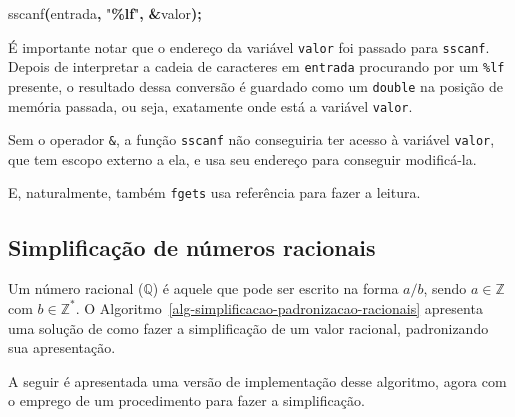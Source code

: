 \documentclass[
  11pt,
  a4paper,
]{scrbook}
\newenvironment{Shaded}{\begin{snugshade}}{\end{snugshade}}
\newcommand{\NormalTok}[1]{#1}
\newcommand{\OperatorTok}[1]{\textcolor[rgb]{0.81,0.36,0.00}{\textbf{#1}}}
\newcommand{\SpecialCharTok}[1]{\textcolor[rgb]{0.81,0.36,0.00}{\textbf{#1}}}
\newcommand{\StringTok}[1]{\textcolor[rgb]{0.31,0.60,0.02}{#1}}
\begin{document}
\begin{Shaded}
\begin{Highlighting}[]
\NormalTok{sscanf}\OperatorTok{(}\NormalTok{entrada}\OperatorTok{,} \StringTok{"}\SpecialCharTok{\%lf}\StringTok{"}\OperatorTok{,} \OperatorTok{\&}\NormalTok{valor}\OperatorTok{);}
\end{Highlighting}
\end{Shaded}

É importante notar que o endereço da variável \texttt{valor} foi passado
para \texttt{sscanf}. Depois de interpretar a cadeia de caracteres em
\texttt{entrada} procurando por um \texttt{\%lf} presente, o resultado
dessa conversão é guardado como um \texttt{double} na posição de memória
passada, ou seja, exatamente onde está a variável \texttt{valor}.

Sem o operador \texttt{\&}, a função \texttt{sscanf} não conseguiria ter
acesso à variável \texttt{valor}, que tem escopo externo a ela, e usa
seu endereço para conseguir modificá-la.

E, naturalmente, também \texttt{fgets} usa referência para fazer a
leitura.

\subsection{Simplificação de números
racionais}\label{simplificauxe7uxe3o-de-nuxfameros-racionais}

Um número racional (\(\mathbb{Q}\)) é aquele que pode ser escrito na
forma \(a/b\), sendo \(a \in \mathbb{Z}\) com \(b \in \mathbb{Z}^*\). O
Algoritmo~\ref{alg-simplificacao-padronizacao-racionais} apresenta uma
solução de como fazer a simplificação de um valor racional, padronizando
sua apresentação.

A seguir é apresentada uma versão de implementação desse algoritmo,
agora com o emprego de um procedimento para fazer a simplificação.
\end{document}
